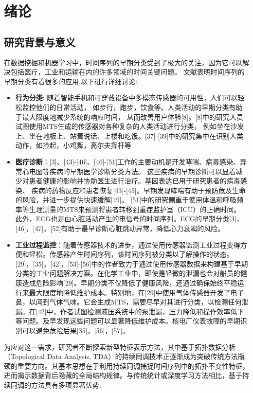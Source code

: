 \section{绪论}
\subsection{研究背景与意义}
在数据挖掘和机器学习中，时间序列的早期分类受到了极大的关注，因为它可以解决包括医疗，工业和运输在内的许多领域的时间关键问题。
文献表明时间序列的早期分类有着很多的应用,以下进行详细讨论:

\begin{itemize}
    \item \textbf{行为分类}: 随着智能手机和可穿戴设备中多模态传感器的可用性，人们可以轻松监控他们的日常活动，
    如步行，跑步，饮食等。人类活动的早期分类有助于最大限度地减少系统的响应时间，
    从而改善用户体验[8]。[8]中的研究人员试图使用MTS生成的传感器对各种复杂的人类活动进行分类，
    例如坐在沙发上、坐在地板上、站着说话、上楼和吃饭。[37]-[39]中的研究集中在识别人类动作，如捡起，小鸡舞，高尔夫挥杆等
    \item \textbf{医疗诊断}：[3]、[43]-[46]、[46]-[51]工作的主要动机是开发哮喘、病毒感染、异常心电图等疾病的早期医学诊断分类方法。
    这些疾病的早期诊断可以显着减少对患者健康的影响并协助医生进行治疗。基因表达已用于研究患者的病毒感染、
    疾病的药物反应和患者恢复[43]-[45]。早期发现哮喘有助于预防危及生命的风险，并进一步提供快速缓解[49]。
    [51]中的研究侧重于使用体温和呼吸频率等生理测量的MTS来预测将患者转移到重症监护室（ICU）的正确时间。
    此外，ECG也是由心脏活动产生的电信号的时间序列。ECG的早期分类[3]，[46]，[47]，[52]有助于最早诊断心脏跳动异常，降低心力衰竭的风险。
    \item \textbf{工业过程监控}：随着传感器技术的进步，通过使用传感器监测工业过程变得方便和轻松。传感器产生时间序列，该时间序列被分类以了解操作的状态。[29]，[35]，[42]，[53]-[56]中的作者致力于通过使用传感器数据来构建基于早期分类的工业问题解决方案。在化学工业中，即使是轻微的泄漏也会对船员的健康造成危险影响[29]。早期分类不仅降低了健康风险，还通过确保始终平稳运行来最大限度地降低维护成本。特别地，在[29]中使用气体传感器开发了电子鼻，以闻到气体气味。它会生成MTS，需要尽早对其进行分类，以检测任何泄漏。在[42]中，作者试图检测液压系统中的泵泄漏、压力降低和操作效率低下等问题。及早发现这些问题可以显著降低维护成本。核电厂仪表故障的早期识别可以避免危险后果[35]，[56]，[57]。

\end{itemize}

为应对这一需求，研究者不断探索新型特征表示方法，其中基于拓扑数据分析（Topological Data Analysis, TDA）的持续同调技术正逐渐成为突破传统方法瓶颈的重要方向。其基本思想在于利用持续同调捕捉时间序列中的拓扑不变性特征，进而揭示数据背后隐藏的全局结构规律。与传统统计或深度学习方法相比，基于持续同调的方法具有多项显著优势:

